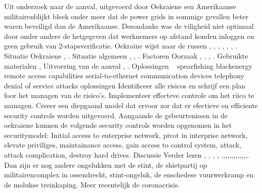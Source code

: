 Uit onderzoek\cite{zetter2016GridHack} naar de aanval,  uitgevoerd door Oekraiene sen Amerikaanse militairenblijkt  bleek onder meer dat de power grids in sommige gevallen beter waren beveiligd dan de Amerikaanse. Desondanks was de viligheid niet optimaal door onder andere de  hetgegeven dat werknemers op afstand konden inloggen en geen gebruik van 2-stapsverificatie.
Oekraine wijst naar de russen \cite{zetter2016GridHack}, 
\cite{greenberg2017Cyberwartestlab},
\cite{boozallen2016lightwentout},
\cite{finkle08012016russiansandwormhackers},
\cite{zinets15022017ukrainechargesrussia},
\cite{mcelfresh2016cyberattackhowandwhy},
\cite{parkwalstorm11102017russiagridattack}.
{Situatie Oekraiene}
\cite{drago2017CrashOverride},
\cite{slowik2019ReassasUkraine2016Attack}.
{Situatie algemeen}
\cite{cerulus2019FrontlineRussiaAttack},
\cite{desarnaud2017cyberattacks},
\cite{dragos2019TargetedTransStation}.
{Factoren}
\cite{shehod2016gridadvantageus}
{Oorzaak}
\cite{rocha2017cybersecyrityanalysisScada},
\cite{2017crashoverridenostuxnet},
\cite{vijayan2017firstmalwareCausedOutage},
\cite{slowik2019ReassasUkraine2016Attack}.
{Gebruikte materialen}
\cite{2015ukrainegridattack},
\cite{industroyershortfact}
{Uitvoering van de aanval}
\cite{Whitehead2017ukrainepoweroutage},
\cite{boozallen2016lightwentout}.
{Oplossingen}
~\cite{Whitehead2017ukrainepoweroutage}
\cite{Whitehead2017ukrainepoweroutage}
\cite{boozallen2016lightwentout}
{spearfishing}
{blackenergy}
{remote access capabilities}
{serial-to-ethernet communication devices}
{telephony denial of service attacks}
{oplossingen}
Identificeer alle risicos en schrijf een plan foor het managen van de risico's.
Implementeer  effecteve controle  om het riico te managen.
Creeer een diepgaand model dat ervoor zor dat er efectieve en efficiente security controls worden uitgevoerd.
Aangaande de gebeurtenissen in de oekraiene kunnen de volgende security controls worden opgenomen in het securitymodel: Initial access to enterprise network, pivot in interprise network, elevate priviliges, maintainance access, gain access to control system, attack, attack complication, destroy hard drives.
\cite{Whitehead2017ukrainepoweroutage}
{Discussie}
{Verder lezen}
\cite{shahzad2014ScadaProtocolsPollingScenario},
\cite{grammatikis2019AttackIEC6087505104},
\cite{2017win32industroyer},
\cite{yadav2020reviewScadaArchitecture},
\cite{arrizabalaga2020surveyiiotProtocols},\cite{fauri2017EncryptionICS},\cite{resch31102019IEC62351secureCommunication},\cite{levalle2020FuzzingICSProtocols},\cite{blackhatusa2017},\cite{blackhatusa2017},\cite{abb30062017crashoverridenotification},\cite{spinner2018crashoverrideiot},\cite{njccicthreat08102017crashovverrideprofile},\cite{slowikvb2018crashoverride},\cite{crashoverridenetwork},\cite{wikiindustroyer},\cite{icsSecurityRussianHacking},\cite{holappa2017threattoElectricityNetworks}.
\newline \indent Dan zijn er nog andere ongelukken met de stint, de shietpartij op militairencomplex in ossendrecht, stint-ongeluk, de enschedese vuurwerkramp en de molukse treinkaping. Meer recentelijk de coronacrisis.





